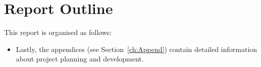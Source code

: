 \section{Report Outline}
\label{sec:report-outline}
This report is organised as follows:
\begin{itemize}
\item Lastly, the appendices (see Section~\ref{ch:Append}) contain detailed
  information about project planning and development.
\end{itemize}


